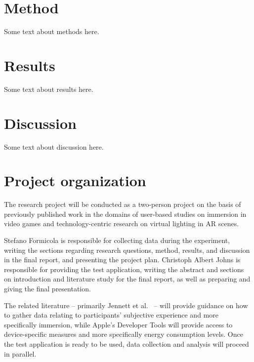 \documentclass[12pt,twoside,english]{article}
\begin{document}
\section{Method}
\label{sect:method}

Some text about methods here.


\section{Results}
\label{sect:results}

Some text about results here.


\section{Discussion}
\label{sect:discussion}

Some text about discussion here.


\section{Project organization}
\label{sect:organization}

The research project will be conducted as a two-person project on the basis of previously published work in the domains of user-based studies on immersion in video games and technology-centric research on virtual lighting in \gls{AR} scenes.

Stefano Formicola is responsible for collecting data during the experiment, writing the sections regarding research questions, method, results, and discussion in the final report, and presenting the project plan.
Christoph Albert Johns is responsible for providing the test application, writing the abstract and sections on introduction and literature study for the final report, as well as preparing and giving the final presentation.

The related literature -- primarily Jennett et al.~\cite{jennett_measuring_2008} -- will provide guidance on how to gather data relating to participants' subjective experience and more specifically immersion, while Apple's Developer Tools will provide access to device-specific measures and more specifically energy consumption levels.
Once the test application is ready to be used, data collection and analysis will proceed in parallel.
\end{document}
